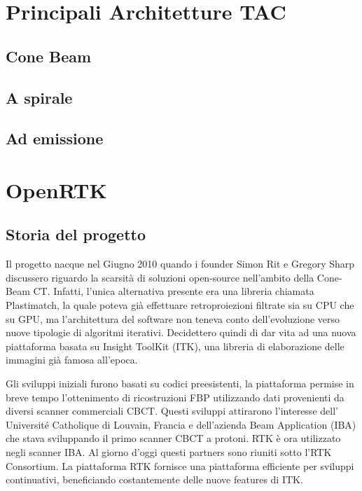 \documentclass[a4paper,11pt, oneside]{article}
\begin{document}
            
        \section{Principali Architetture TAC}
            \subsection{Cone Beam}
            \subsection{A spirale}
            \subsection{Ad emissione}
        
        
        \section{OpenRTK}
            \subsection{Storia del progetto}
                \par 
                    Il progetto nacque nel Giugno 2010 quando i founder Simon Rit e Gregory Sharp discussero riguardo la scarsità di soluzioni open-source nell'ambito della Cone-Beam CT. Infatti, l'unica alternativa presente era una libreria chiamata Plastimatch, la quale poteva già effettuare retroproiezioni filtrate sia su CPU che su GPU, ma l'architettura del software non teneva conto dell'evoluzione verso nuove tipologie di algoritmi iterativi. Decidettero quindi di dar vita ad una nuova piattaforma basata su Insight ToolKit (ITK), una libreria di elaborazione delle immagini già famosa all'epoca.
                \par
                    Gli sviluppi iniziali furono basati su codici preesistenti, la piattaforma permise in breve tempo l'ottenimento di ricostruzioni FBP utilizzando dati provenienti da diversi scanner commerciali CBCT. Questi sviluppi attirarono l'interesse dell' Université Catholique di Louvain, Francia e dell'azienda Beam Application (IBA) che stava sviluppando il primo scanner CBCT a protoni. RTK è ora utilizzato negli scanner IBA. Al giorno d'oggi questi partners sono riuniti sotto l'RTK Consortium. La piattaforma RTK fornisce una piattaforma efficiente per sviluppi continuativi, beneficiando costantemente delle nuove features di ITK.
                \par
                
\end{document}
